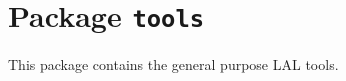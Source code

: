 \chapter{Package \texttt{tools}}

This package contains the general purpose LAL tools.



\newpage\begin{thebibliography}{0}


\end{thebibliography}
